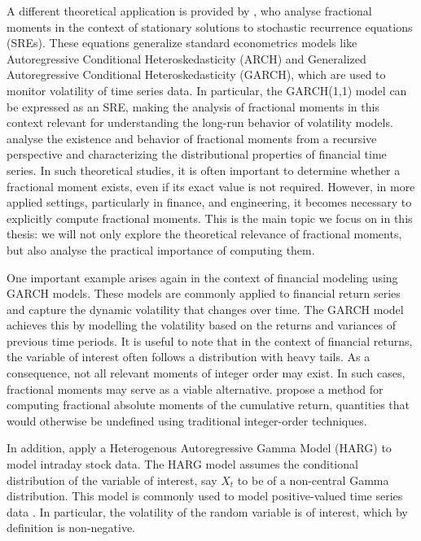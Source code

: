 A different theoretical application is provided by \citet{Mikosc2013}, who analyse fractional moments in the context of stationary solutions to stochastic recurrence equations (SREs). These equations generalize standard econometrics models like Autoregressive Conditional Heteroskedasticity (ARCH) and Generalized Autoregressive Conditional Heteroskedasticity (GARCH), which are used to monitor volatility of time series data. In particular, the GARCH(1,1) model can be expressed as an SRE, making the analysis of fractional moments in this context relevant for understanding the long-run behavior of volatility models. \citet{Mikosc2013} analyse the existence and behavior of fractional moments from a recursive perspective and characterizing the distributional properties of financial time series. 
\newline
In such theoretical studies, it is often important to determine whether a fractional moment exists, even if its exact value is not required. However, in more applied settings, particularly in finance, and engineering, it becomes necessary to explicitly compute fractional moments. This is the main topic we focus on in this thesis: we will not only explore the theoretical relevance of fractional moments, but also analyse the practical importance of computing them.

One important example arises again in the context of financial modeling using GARCH models. These models are commonly applied to financial return series and capture the dynamic volatility that changes over time. The GARCH model achieves this by modelling the volatility based on the returns and variances of previous time periods. It is useful to note that in the context of financial returns, the variable of interest often follows a distribution with heavy tails. As a consequence, not all relevant moments of integer order may exist. In such cases, fractional moments may serve as a viable alternative.  \citet{hansen2024} propose a method for computing fractional absolute moments of the cumulative return, quantities that would otherwise be undefined using traditional integer-order techniques. 

In addition, \citet{hansen2024} apply a Heterogenous Autoregressive Gamma Model (HARG) to model intraday stock data. The HARG model assumes the conditional distribution of the variable of interest, say \(X_t\) to be of a non-central Gamma distribution. This model is commonly used to model positive-valued time series data \citep{gourierroux2006}. In particular, the volatility of the random variable is of interest, which by definition is non-negative.

